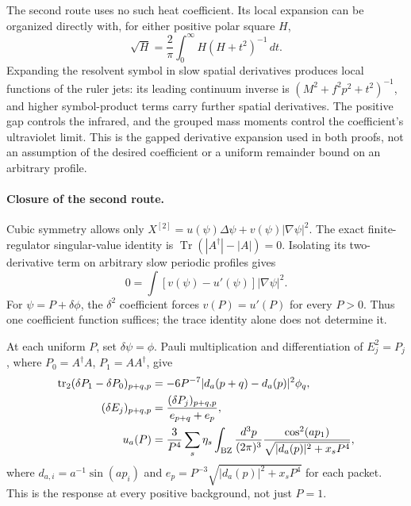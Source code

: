 The second route uses no such heat coefficient.  Its local expansion
can be organized directly with, for either positive polar square $H$,
\[
 \sqrt H=\frac2\pi\int_0^\infty H(H+t^2)^{-1}\,dt .
\]
Expanding the resolvent symbol in slow spatial derivatives produces
local functions of the ruler jets: its leading continuum inverse is
$(M^2+f^2p^2+t^2)^{-1}$, and higher symbol-product terms carry
further spatial derivatives.  The positive gap controls the
infrared, and the grouped mass moments control the coefficient's
ultraviolet limit.  This is the gapped derivative expansion used in
both proofs, not an assumption of the desired coefficient or a
uniform remainder bound on an arbitrary profile.

\paragraph*{Closure of the second route.}
Cubic symmetry allows only
$X^{[2]}=u(\psi)\Delta\psi+v(\psi)|\nabla\psi|^2$.
The exact finite-regulator singular-value identity is
$\operatorname{Tr}(|A^\dagger|-|A|)=0$.
Isolating its two-derivative term on arbitrary slow periodic profiles
gives
\[
 0=\int [v(\psi)-u'(\psi)]|\nabla\psi|^2 .
\]
For $\psi=P+\delta\phi$, the $\delta^2$ coefficient forces
$v(P)=u'(P)$ for every $P>0$.  Thus one coefficient function suffices;
the trace identity alone does not determine it.

At each uniform $P$, set $\delta\psi=\phi$.  Pauli multiplication and differentiation
of $E_j^2=P_j$, where $P_0=A^\dagger A$, $P_1=AA^\dagger$, give
\[
 \begin{aligned}
 \operatorname{tr}_2(\delta P_1-\delta P_0)_{p+q,p}
   &=-6P^{-7}|d_a(p+q)-d_a(p)|^2\phi_q,\\
 (\delta E_j)_{p+q,p}
   &=\frac{(\delta P_j)_{p+q,p}}{e_{p+q}+e_p},\\
 u_a(P)&=\frac3{P^4}\sum_s\eta_s\int_{\rm BZ}
 \frac{d^3p}{(2\pi)^3}
 \frac{\cos^2(ap_1)}{\sqrt{|d_a(p)|^2+x_sP^4}},
 \end{aligned}
\]
where $d_{a,i}=a^{-1}\sin(ap_i)$ and
$e_p=P^{-3}\sqrt{|d_a(p)|^2+x_sP^4}$ for each packet.
This is the response at every positive background, not just $P=1$.

